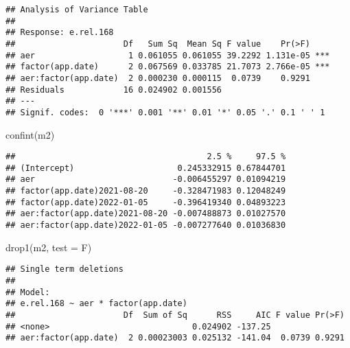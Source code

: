 \documentclass[
]{article}
\newenvironment{Shaded}{\begin{snugshade}}{\end{snugshade}}
\newcommand{\AttributeTok}[1]{\textcolor[rgb]{0.77,0.63,0.00}{#1}}
\newcommand{\FunctionTok}[1]{\textcolor[rgb]{0.00,0.00,0.00}{#1}}
\newcommand{\NormalTok}[1]{#1}
\newcommand{\StringTok}[1]{\textcolor[rgb]{0.31,0.60,0.02}{#1}}
\begin{document}
\begin{verbatim}
## Analysis of Variance Table
## 
## Response: e.rel.168
##                      Df   Sum Sq  Mean Sq F value    Pr(>F)    
## aer                   1 0.061055 0.061055 39.2292 1.131e-05 ***
## factor(app.date)      2 0.067569 0.033785 21.7073 2.766e-05 ***
## aer:factor(app.date)  2 0.000230 0.000115  0.0739    0.9291    
## Residuals            16 0.024902 0.001556                      
## ---
## Signif. codes:  0 '***' 0.001 '**' 0.01 '*' 0.05 '.' 0.1 ' ' 1
\end{verbatim}

\begin{Shaded}
\begin{Highlighting}[]
\FunctionTok{confint}\NormalTok{(m2)}
\end{Highlighting}
\end{Shaded}

\begin{verbatim}
##                                       2.5 %     97.5 %
## (Intercept)                     0.245332915 0.67844701
## aer                            -0.006455297 0.01094219
## factor(app.date)2021-08-20     -0.328471983 0.12048249
## factor(app.date)2022-01-05     -0.396419340 0.04893223
## aer:factor(app.date)2021-08-20 -0.007488873 0.01027570
## aer:factor(app.date)2022-01-05 -0.007277640 0.01036830
\end{verbatim}

\begin{Shaded}
\begin{Highlighting}[]
\FunctionTok{drop1}\NormalTok{(m2, }\AttributeTok{test =} \StringTok{\textquotesingle{}F\textquotesingle{}}\NormalTok{)}
\end{Highlighting}
\end{Shaded}

\begin{verbatim}
## Single term deletions
## 
## Model:
## e.rel.168 ~ aer * factor(app.date)
##                      Df  Sum of Sq      RSS     AIC F value Pr(>F)
## <none>                             0.024902 -137.25               
## aer:factor(app.date)  2 0.00023003 0.025132 -141.04  0.0739 0.9291
\end{verbatim}
\end{document}
